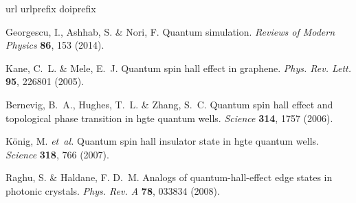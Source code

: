 \documentclass[
aps,
prl,
groupedaddress,
superscriptaddress,
floatfix,
notitlepage
]{revtex4-1}
\begin{document}
%

\begin{thebibliography}{10}
	\expandafter\ifx\csname url\endcsname\relax
	\def\url#1{\texttt{#1}}\fi
	\expandafter\ifx\csname urlprefix\endcsname\relax\def\urlprefix{URL }\fi
	\expandafter\ifx\csname doiprefix\endcsname\relax\def\doiprefix{DOI }\fi
	\providecommand{\bibinfo}[2]{#2}
	\providecommand{\eprint}[2][]{\url{#2}}
	
	\bibinfo{author}{Georgescu, I.}, \bibinfo{author}{Ashhab, S.} \&
	\bibinfo{author}{Nori, F.}
	\newblock \bibinfo{title}{Quantum simulation}.
	\newblock \emph{\bibinfo{journal}{Reviews of Modern Physics}}
	\textbf{\bibinfo{volume}{86}}, \bibinfo{pages}{153} (\bibinfo{year}{2014}).
	
	\bibinfo{author}{Kane, C.~L.} \& \bibinfo{author}{Mele, E.~J.}
	\newblock \bibinfo{title}{Quantum spin hall effect in graphene}.
	\newblock \emph{\bibinfo{journal}{Phys. Rev. Lett.}}
	\textbf{\bibinfo{volume}{95}}, \bibinfo{pages}{226801}
	(\bibinfo{year}{2005}).
	
	\bibinfo{author}{Bernevig, B.~A.}, \bibinfo{author}{Hughes, T.~L.} \&
	\bibinfo{author}{Zhang, S.~C.}
	\newblock \bibinfo{title}{Quantum spin hall effect and topological phase
		transition in hgte quantum wells}.
	\newblock \emph{\bibinfo{journal}{Science}} \textbf{\bibinfo{volume}{314}},
	\bibinfo{pages}{1757} (\bibinfo{year}{2006}).
	
	\bibinfo{author}{K\"{o}nig, M.} \emph{et~al.}
	\newblock \bibinfo{title}{Quantum spin hall insulator state in hgte quantum
		wells}.
	\newblock \emph{\bibinfo{journal}{Science}} \textbf{\bibinfo{volume}{318}},
	\bibinfo{pages}{766} (\bibinfo{year}{2007}).
	
	\bibinfo{author}{Raghu, S.} \& \bibinfo{author}{Haldane, F. D.~M.}
	\newblock \bibinfo{title}{Analogs of quantum-hall-effect edge states in
		photonic crystals}.
	\newblock \emph{\bibinfo{journal}{Phys. Rev. A}} \textbf{\bibinfo{volume}{78}},
	\bibinfo{pages}{033834} (\bibinfo{year}{2008}).
	

\end{thebibliography}
\end{document}
